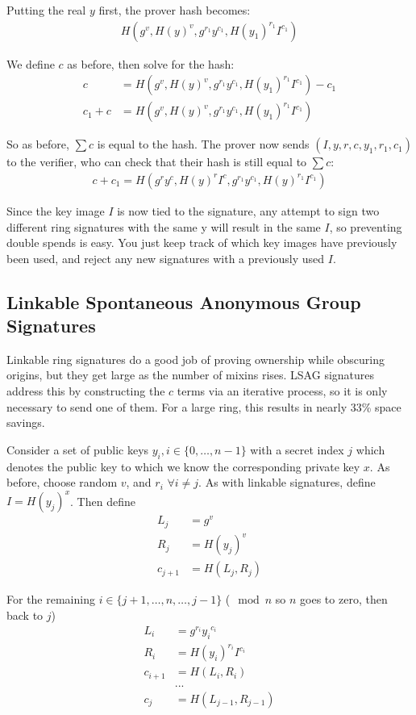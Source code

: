 \documentclass{article}
\begin{document}
Putting the real $y$ first, the prover hash becomes:
\begin{align}
  H(g^v, H(y)^v, g^{r_1} y^{c_1}, H(y_1)^{r_1} I^{c_1})
\end{align}

We define $c$ as before, then solve for the hash:
\begin{align}
  c &= H(g^v, H(y)^v, g^{r_1} y^{c_1}, H(y_1)^{r_1} I^{c_1}) - c_1\\
  c_1 + c &= H(g^v, H(y)^v, g^{r_1} y^{c_1}, H(y_1)^{r_1} I^{c_1})\nonumber
\end{align}

So as before, $\sum c$ is equal to the hash.  The prover now sends $(I, y, r, c, y_1, r_1, c_1)$ to the verifier, who can check that their hash is still equal to $\sum c$:
\begin{align}
  c + c_1 = H(g^r y^c, H(y)^r I^c, g^{r_1} y^{c_1}, H(y)^{r_1} I^{c_1})
\end{align}

Since the key image $I$ is now tied to the signature, any attempt to sign two different ring signatures with the same y will result in the same $I$, so preventing double spends is easy.  You just keep track of which key images have previously been used, and reject any new signatures with a previously used $I$.


\subsection{Linkable Spontaneous Anonymous Group Signatures}

Linkable ring signatures do a good job of proving ownership while obscuring origins, but they get large as the number of mixins rises. LSAG signatures address this by constructing the $c$ terms via an iterative process, so it is only necessary to send one of them.  For a large ring, this results in nearly 33\% space savings.

Consider a set of public keys $y_i, i \in \{0, …, n-1\}$ with a secret index $j$ which denotes the public key to which we know the corresponding private key $x$.  As before, choose random $v$, and $r_i$ $\forall i \ne j$.  As with linkable signatures, define $I = H(y_j)^x$. Then define
\begin{align}
      L_j &= g^v\\
      R_j &= H(y_j)^v\\
  c_{j+1} &= H(L_j,R_j)
\end{align}

For the remaining $i \in \{j+1, …, n, …, j-1\}$ ($\mod{n}$ so $n$ goes to zero, then back to $j$)
\begin{align}
  L_i &= g^{r_i} {y_i}^{c_i}\\
  R_i &= H(y_i)^{r_i} I^{c_i}\\
  c_{i+1} &= H(L_i,R_i)\\
  &... \nonumber\\
  c_j &= H(L_{j-1}, R_{j-1})
\end{align}
\end{document}
